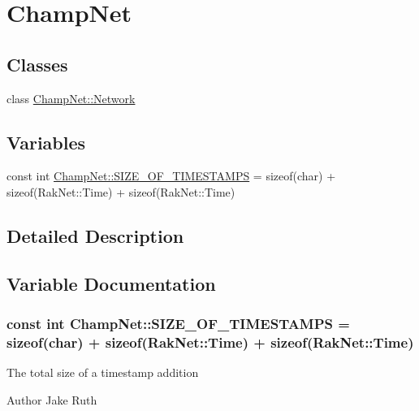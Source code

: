 \hypertarget{group__champnet}{\section{Champ\-Net}
\label{group__champnet}
}
\subsection*{Classes}
\begin{DoxyCompactItemize}
\item 
class \hyperlink{class_champ_net_1_1_network}{Champ\-Net\-::\-Network}
\end{DoxyCompactItemize}
\subsection*{Variables}
\begin{DoxyCompactItemize}
\item 
const int \hyperlink{group__champnet_gae8bece8e869e20f234d9ae67256a735f}{Champ\-Net\-::\-S\-I\-Z\-E\-\_\-\-O\-F\-\_\-\-T\-I\-M\-E\-S\-T\-A\-M\-P\-S} = sizeof(char) + sizeof(Rak\-Net\-::\-Time) + sizeof(Rak\-Net\-::\-Time)
\end{DoxyCompactItemize}


\subsection{Detailed Description}


\subsection{Variable Documentation}
\hypertarget{group__champnet_gae8bece8e869e20f234d9ae67256a735f}{
\subsubsection[{S\-I\-Z\-E\-\_\-\-O\-F\-\_\-\-T\-I\-M\-E\-S\-T\-A\-M\-P\-S}]{\setlength{\rightskip}{0pt plus 5cm}const int Champ\-Net\-::\-S\-I\-Z\-E\-\_\-\-O\-F\-\_\-\-T\-I\-M\-E\-S\-T\-A\-M\-P\-S = sizeof(char) + sizeof(Rak\-Net\-::\-Time) + sizeof(Rak\-Net\-::\-Time)}}\label{group__champnet_gae8bece8e869e20f234d9ae67256a735f}
The total size of a timestamp addition \begin{DoxyAuthor}{Author}
Jake Ruth 
\end{DoxyAuthor}
